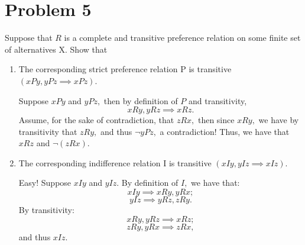 \documentclass[11pt]{article}
\begin{document}
\section*{Problem 5}
\begin{problem}
    Suppose that $R$ is a complete and transitive preference relation on some finite set of alternatives X. Show that
    \begin{enumerate}
        \item 
        \begin{problem}
        The corresponding strict preference relation P is transitive $(xPy, yPz \implies xPz)$.
        \end{problem}
        \begin{solution}
            Suppose $xPy$ and $yPz,$ then by definition of $P$ and transitivity, 
            \[xRy, yRz \implies xRz.\]
            Assume, for the sake of contradiction, that $zRx,$ then since $xRy,$ we have by transitivity that $zRy,$ and thus $\neg yPz,$ a contradiction! Thus, we have that $xRz$ and $\neg (zRx).$
        \end{solution}
        \item 
        \begin{problem}
        The corresponding indifference relation I is transitive $(xIy, yIz \implies xIz).$
        \end{problem}
        \begin{solution}
            Easy! Suppose $xIy$ and $yIz.$ By definition of $I,$ we have that:
            \[xIy \implies xRy, yRx;\]
            \[yIz \implies yRz, zRy.\]
            By transitivity:
            \[xRy, yRz \implies xRz;\]
            \[zRy,yRx\implies zRx,\] and thus $xIz.$
        \end{solution}
    \end{enumerate}
\end{problem}

\newpage
\end{document}
